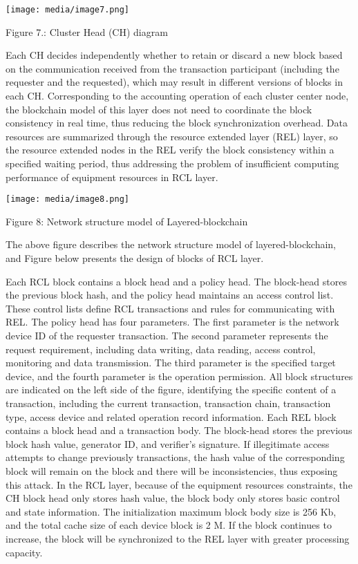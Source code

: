 \documentclass[
]{article}
\begin{document}
\texttt{[image: media/image7.png]}

Figure 7.: Cluster Head (CH) diagram

Each CH decides independently whether to retain or discard a new block
based on the communication received from the transaction participant
(including the requester and the requested), which may result in
different versions of blocks in each CH. Corresponding to the accounting
operation of each cluster center node, the blockchain model of this
layer does not need to coordinate the block consistency in real time,
thus reducing the block synchronization overhead. Data resources are
summarized through the resource extended layer (REL) layer, so the
resource extended nodes in the REL verify the block consistency within a
specified waiting period, thus addressing the problem of insufficient
computing performance of equipment resources in RCL layer.

\texttt{[image: media/image8.png]}

Figure 8: Network structure model of Layered-blockchain

The above figure describes the network structure model of
layered-blockchain, and Figure below presents the design of blocks of
RCL layer.

Each RCL block contains a block head and a policy head. The block-head
stores the previous block hash, and the policy head maintains an access
control list. These control lists define RCL transactions and rules for
communicating with REL. The policy head has four parameters. The first
parameter is the network device ID of the requester transaction. The
second parameter represents the request requirement, including data
writing, data reading, access control, monitoring and data transmission.
The third parameter is the specified target device, and the fourth
parameter is the operation permission. All block structures are
indicated on the left side of the figure, identifying the specific
content of a transaction, including the current transaction, transaction
chain, transaction type, access device and related operation record
information. Each REL block contains a block head and a transaction
body. The block-head stores the previous block hash value, generator ID,
and verifier's signature. If illegitimate access attempts to change
previously transactions, the hash value of the corresponding block will
remain on the block and there will be inconsistencies, thus exposing
this attack. In the RCL layer, because of the equipment resources
constraints, the CH block head only stores hash value, the block body
only stores basic control and state information. The initialization
maximum block body size is 256 Kb, and the total cache size of each
device block is 2 M. If the block continues to increase, the block will
be synchronized to the REL layer with greater processing capacity.
\end{document}
